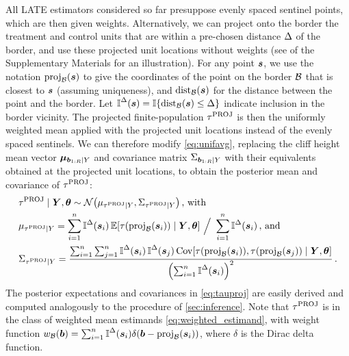 All LATE estimators considered so far presuppose evenly spaced sentinel points, which are then given weights.
Alternatively, we can project onto the border the treatment and control units that are within a pre-chosen distance \(\Delta\) of the border, and use these projected unit locations without weights (see  of the Supplementary Materials for an illustration).
For any point \(\bm{s}\), we use the notation \(\proj_{\border}\del{\svec}\) to give the coordinates of the point on the border \(\mathcal{B}\) that is closest to \(\bm{s}\) (assuming uniqueness), and \(\dist_{\border}\del{\svec}\) for the distance between the point and the border.
Let \(\vicinity{\svec} = \allowbreak \Ind\cbr{\dist_{\border}\del{\svec} \le \buffer} \) indicate inclusion in the border vicinity.
The projected finite-population \(\tau^{\mathrm{PROJ}}\) is then the uniformly weighted mean applied with the projected unit locations instead of the evenly spaced sentinels.
We can therefore modify \autoref{eq:unifavg}, replacing the cliff height mean vector \(\bm{\mu}_{\bm{b}_{1:R} \mid Y}\)
and covariance matrix \(\Sigma_{\bm{b}_{1:R} \mid Y}\)
with their equivalents obtained at the projected unit locations,
to obtain the posterior mean and covariance of \(\tau^{\mathrm{PROJ}}\):
\begin{equation}\begin{split}
    &\tauproj \mid \Yvec, \hyperparam \sim \normal\del{\mu_{\tauproj \mid Y}, \Sigma_{\tauproj \mid Y}}\,\text{, with} \\
    &\mu_{\tauproj \mid Y} = 
    \sum_{i=1}^{n}
    \vicinity{\svec_i}
    \E\sbr{
        \tau\del{
            \proj_{\border}\del{\svec_i}
        }
        \mid \Yvec, \hyperparam
    } 
    \ 
    \Big/
    \ 
        \sum_{i=1}^{n}
        \vicinity{\svec_i}
    \,\text{, and}\\
    &\Sigma_{\tauproj \mid Y} = 
    \frac{
        \sum_{i=1}^{n} 
        \sum_{j=1}^{n} 
        \vicinity{\svec_i}
        \vicinity{\svec_j}
        \cov\sbr{
            \tau\del{
                \proj_{\border}\del{\svec_i}
            },
            \tau\del{
                \proj_{\border}\del{\svec_j}
            }
            \mid \Yvec, \hyperparam
        }
    }{
        \del{
            \sum_{i=1}^{n}
            \vicinity{\svec_i}
        }^2
    }
    \,.
\end{split}
\label{eq:tauproj}
\end{equation}
The posterior expectations and covariances in \autoref{eq:tauproj} are easily derived and computed analogously to the procedure of \autoref{sec:inference}.
Note that \(\tau^{\mathrm{PROJ}}\) is in the class of weighted mean estimands \autoref{eq:weighted_estimand},
with weight function \(\weightb(\sentinel) = \sum_{i=1}^{n} \vicinity{\svec_i} \delta\del{ \sentinel - \proj_\border(\svec_i)}\), where \(\delta\) is the Dirac delta function.

